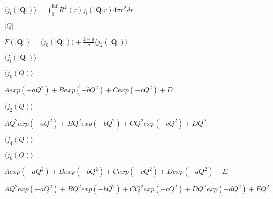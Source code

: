 \documentclass[twoside]{article}
\def\lthtmlcheckvsize{\ifdim\ht\sizebox<\vsize 
  \ifdim\wd\sizebox<\hsize\expandafter\hfill\fi \expandafter\vfill
  \else\expandafter\vss\fi}%
\begin{document}
{\newpage\clearpage
{}%
$\displaystyle
\langle j_l(|\mathbf Q|) \rangle=\int_0^{\inf} R^2(r) j_l(|\mathbf Q|r) 4\pi r^2 dr
$%
\lthtmlindisplaymathZ
\lthtmlcheckvsize\clearpage}

{\newpage\clearpage
{}%
$|Q|$%
\lthtmlindisplaymathZ
\lthtmlcheckvsize\clearpage}

{\newpage\clearpage
{}%
$\displaystyle F(|\mathbf Q|)=\langle j_0(|\mathbf Q|) \rangle + \frac{2-g}{g}\langle j_2(|\mathbf Q|) \rangle  
$%
\lthtmlindisplaymathZ
\lthtmlcheckvsize\clearpage}

{\newpage\clearpage
{}%
$\langle j_l(|\mathbf Q|) \rangle$%
\lthtmlindisplaymathZ
\lthtmlcheckvsize\clearpage}

{\newpage\clearpage
{}%
$\displaystyle \langle j_0(Q) \rangle$%
\lthtmlindisplaymathZ
\lthtmlcheckvsize\clearpage}

{\newpage\clearpage
{}%
$\displaystyle A exp(-aQ^2)+B exp(-bQ^2)+C exp(-cQ^2)+D$%
\lthtmlindisplaymathZ
\lthtmlcheckvsize\clearpage}

{\newpage\clearpage
{}%
$\displaystyle \langle j_2(Q) \rangle$%
\lthtmlindisplaymathZ
\lthtmlcheckvsize\clearpage}

{\newpage\clearpage
{}%
$\displaystyle A Q^2 exp(-aQ^2)+B Q^2 exp(-bQ^2)+C Q^2 exp(-cQ^2)+D Q^2$%
\lthtmlindisplaymathZ
\lthtmlcheckvsize\clearpage}

{\newpage\clearpage
{}%
$\displaystyle \langle j_4(Q) \rangle$%
\lthtmlindisplaymathZ
\lthtmlcheckvsize\clearpage}

{\newpage\clearpage
{}%
$\displaystyle \langle j_6(Q) \rangle$%
\lthtmlindisplaymathZ
\lthtmlcheckvsize\clearpage}

{\newpage\clearpage
{}%
$\displaystyle A exp(-aQ^2)+B exp(-bQ^2)+C exp(-cQ^2)+D exp(-dQ^2)+E$%
\lthtmlindisplaymathZ
\lthtmlcheckvsize\clearpage}

{\newpage\clearpage
{}%
$\displaystyle A Q^2 exp(-aQ^2)+B Q^2 exp(-bQ^2)+C Q^2 exp(-cQ^2)+D Q^2 exp(-dQ^2)+ E Q^2$%
\lthtmlindisplaymathZ
\lthtmlcheckvsize\clearpage}
\end{document}
